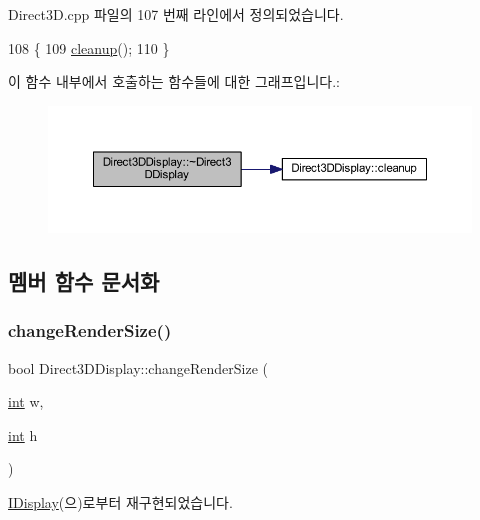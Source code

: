 Direct3\+D.\+cpp 파일의 107 번째 라인에서 정의되었습니다.


\begin{DoxyCode}
108 \{
109     \mbox{\hyperlink{class_direct3_d_display_aabdde19c435c484db2e334eca28a8147}{cleanup}}();
110 \}
\end{DoxyCode}
이 함수 내부에서 호출하는 함수들에 대한 그래프입니다.\+:
\nopagebreak
\begin{figure}[H]
\begin{center}
\leavevmode
\includegraphics[width=350pt]{class_direct3_d_display_a11987c1fc63954e5cdf7efa717631554_cgraph}
\end{center}
\end{figure}


\subsection{멤버 함수 문서화}
\mbox{\label{class_direct3_d_display_a74e1d9129809bda1014bac928cd0fe52}} 
\subsubsection{\texorpdfstring{change\+Render\+Size()}{changeRenderSize()}}
{\footnotesize\ttfamily bool Direct3\+D\+Display\+::change\+Render\+Size (\begin{DoxyParamCaption}\item[{\mbox{\hyperlink{_util_8cpp_a0ef32aa8672df19503a49fab2d0c8071}{int}}}]{w,  }\item[{\mbox{\hyperlink{_util_8cpp_a0ef32aa8672df19503a49fab2d0c8071}{int}}}]{h }\end{DoxyParamCaption})\hspace{0.3cm}{\ttfamily [virtual]}}



\mbox{\hyperlink{class_i_display_ab6e4355da026afb85710ae3e12329176}{I\+Display}}(으)로부터 재구현되었습니다.



